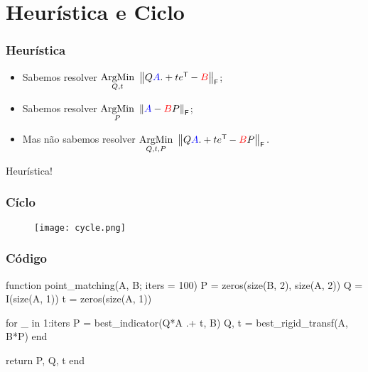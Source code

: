 
\section{Heurística e Ciclo}

\begin{frame}[fragile]
  \frametitle{Heurística}
  \begin{itemize}
    \item Sabemos resolver $\underset{Q,t}{\text{ArgMin}}\,\, \left\lVert Q\textcolor{blue}{A} .+ t e^{\mathsf{T}\mkern-1mu} - \textcolor{red}{B}\right\rVert_\mathsf{F}$; \vspace{1cm}
    \item Sabemos resolver $\underset{P}{\text{ArgMin}}\,\, \left\lVert\textcolor{blue}{A} - \textcolor{red}{B}P\right\rVert_\mathsf{F}$; \vspace{1cm}
    \item Mas não sabemos resolver $\underset{Q,t,P}{\text{ArgMin}}\,\, \left\lVert Q\textcolor{blue}{A} .+ t e^{\mathsf{T}\mkern-1mu} - \textcolor{red}{B}P\right\rVert_\mathsf{F}.$
  \end{itemize}
  \vspace{1cm}
  \begin{center}
    Heurística!
  \end{center}
\end{frame}

\begin{frame}
  \frametitle{Cíclo}
  \begin{figure}
    \centering
    \texttt{[image: cycle.png]}
  \end{figure}
\end{frame}

\begin{frame}[fragile]
  \frametitle{Código}
  \begin{code}
    function point_matching(A, B; iters = 100)
      P = zeros(size(B, 2), size(A, 2))
      Q = I(size(A, 1))
      t = zeros(size(A, 1))

      for _ in 1:iters
        P = best_indicator(Q*A .+ t, B)
        Q, t = best_rigid_transf(A, B*P)
      end

      return P, Q, t
    end
  \end{code}
\end{frame}
